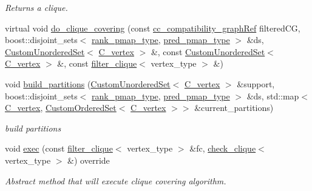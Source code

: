\begin{DoxyCompactItemize}
\begin{DoxyCompactList}\small\item\em Returns a clique. \end{DoxyCompactList}\item 
virtual void \hyperlink{classcoloring__based__clique__covering_ab6db4b8e878397afcd5378715d438046}{do\+\_\+clique\+\_\+covering} (const \hyperlink{clique__covering__graph_8hpp_ac7a90ca8b64cfc536aaf17bc81186c18}{cc\+\_\+compatibility\+\_\+graph\+Ref} filtered\+CG, boost\+::disjoint\+\_\+sets$<$ \hyperlink{clique__covering__graph_8hpp_af170aff46b9e4328f1ad9b119cf78b4a}{rank\+\_\+pmap\+\_\+type}, \hyperlink{clique__covering__graph_8hpp_af4c454ac367cfb12e29c98e6bc942a06}{pred\+\_\+pmap\+\_\+type} $>$ \&ds, \hyperlink{classCustomUnorderedSet}{Custom\+Unordered\+Set}$<$ \hyperlink{clique__covering__graph_8hpp_a9cb45047ea8c5ed95a8cfa90494345aa}{C\+\_\+vertex} $>$ \&, const \hyperlink{classCustomUnorderedSet}{Custom\+Unordered\+Set}$<$ \hyperlink{clique__covering__graph_8hpp_a9cb45047ea8c5ed95a8cfa90494345aa}{C\+\_\+vertex} $>$ \&, const \hyperlink{structfilter__clique}{filter\+\_\+clique}$<$ vertex\+\_\+type $>$ \&)
\item 
void \hyperlink{classcoloring__based__clique__covering_a5834eb8fef3ff145870f5dbe25369060}{build\+\_\+partitions} (\hyperlink{classCustomUnorderedSet}{Custom\+Unordered\+Set}$<$ \hyperlink{clique__covering__graph_8hpp_a9cb45047ea8c5ed95a8cfa90494345aa}{C\+\_\+vertex} $>$ \&support, boost\+::disjoint\+\_\+sets$<$ \hyperlink{clique__covering__graph_8hpp_af170aff46b9e4328f1ad9b119cf78b4a}{rank\+\_\+pmap\+\_\+type}, \hyperlink{clique__covering__graph_8hpp_af4c454ac367cfb12e29c98e6bc942a06}{pred\+\_\+pmap\+\_\+type} $>$ \&ds, std\+::map$<$ \hyperlink{clique__covering__graph_8hpp_a9cb45047ea8c5ed95a8cfa90494345aa}{C\+\_\+vertex}, \hyperlink{classCustomOrderedSet}{Custom\+Ordered\+Set}$<$ \hyperlink{clique__covering__graph_8hpp_a9cb45047ea8c5ed95a8cfa90494345aa}{C\+\_\+vertex} $>$$>$ \&current\+\_\+partitions)
\begin{DoxyCompactList}\small\item\em build partitions \end{DoxyCompactList}\item 
void \hyperlink{classcoloring__based__clique__covering_aeb77d6c0bdc7d04c9b1dcff7baed450b}{exec} (const \hyperlink{structfilter__clique}{filter\+\_\+clique}$<$ vertex\+\_\+type $>$ \&fc, \hyperlink{structcheck__clique}{check\+\_\+clique}$<$ vertex\+\_\+type $>$ \&) override
\begin{DoxyCompactList}\small\item\em Abstract method that will execute clique covering algorithm. \end{DoxyCompactList}\item 
$$
\end{DoxyCompactItemize}
